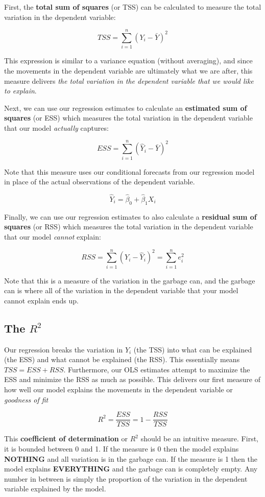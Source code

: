 \documentclass[
]{book}
\begin{document}
First, the \textbf{total sum of squares} (or TSS) can be calculated to measure the total variation in the dependent variable:

\[TSS = \sum^{n}_{i=1}(Y_i - \bar{Y})^2\]

This expression is similar to a variance equation (without averaging), and since the movements in the dependent variable are ultimately what we are after, this measure delivers \emph{the total variation in the dependent variable that we would like to explain}.

Next, we can use our regression estimates to calculate an \textbf{estimated sum of squares} (or ESS) which measures the total variation in the dependent variable that our model \emph{actually} captures:

\[ESS = \sum^{n}_{i=1}(\hat{Y}_i - \bar{Y})^2\]

Note that this measure uses our conditional forecasts from our regression model in place of the actual observations of the dependent variable.

\[\hat{Y}_i = \hat{\beta}_0 + \hat{\beta}_1 X_i\]

Finally, we can use our regression estimates to also calculate a \textbf{residual sum of squares} (or RSS) which measures the total variation in the dependent variable that our model \emph{cannot} explain:

\[RSS = \sum^{n}_{i=1}(Y_i - \hat{Y}_i)^2 = \sum^{n}_{i=1}e_i^2\]

Note that this is a measure of the variation in the garbage can, and the garbage can is where all of the variation in the dependent variable that your model cannot explain ends up.

\subsection{\texorpdfstring{The \(R^2\)}{The R\^{}2}}\label{the-r2}

Our regression breaks the variation in \(Y_i\) (the TSS) into what can be explained (the ESS) and what cannot be explained (the RSS). This essentially means \(TSS=ESS+RSS\). Furthermore, our OLS estimates attempt to maximize the ESS and minimize the RSS as much as possible. This delivers our first measure of how well our model explains the movements in the dependent variable or \emph{goodness of fit}

\[R^2 = \frac{ESS}{TSS} = 1 - \frac{RSS}{TSS}\]

This \textbf{coefficient of determination} or \(R^2\) should be an intuitive measure. First, it is bounded between 0 and 1. If the measure is 0 then the model explains \textbf{NOTHING} and all variation is in the garbage can. If the measure is 1 then the model explains \textbf{EVERYTHING} and the garbage can is completely empty. Any number in between is simply the proportion of the variation in the dependent variable explained by the model.
\end{document}
